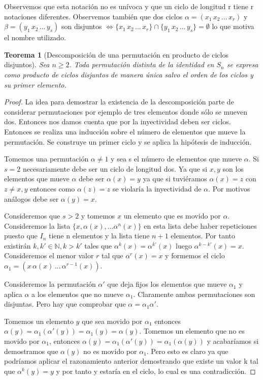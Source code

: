 \documentclass{article}
\theoremstyle{theorem-style}  %
\newtheorem{theorem}{Teorema}[section]  %
\theoremstyle{definition-style}
\theoremstyle{example-style}
\begin{document}
Observemos que esta notación no es unívoca y que un ciclo de longitud r tiene r notaciones diferentes. Observemos también que dos ciclos $\alpha = (x_1 \, x_2 \, ... \, x_r)$ y $\beta = (y_1 \, x_2 \, ... \, y_s)$ son disjuntos $\iff \{x_1 \, x_2 \, ... \, x_r \} \cap \{y_1 \, x_2 \, ... \, y_s \} = \emptyset$ lo que motiva el nombre utilizado.

\begin{theorem}[Descomposición de una permutación en producto de ciclos disjuntos]
Sea $n \ge 2$. Toda permutación distinta de la identidad en $S_n$ se expresa como producto de ciclos disjuntos de manera única salvo el orden de los ciclos y su primer elemento.
\end{theorem}

\begin{proof}
La idea para demostrar la existencia de la descomposición parte de considerar permutaciones por ejemplo de tres elementos donde sólo se mueven dos. Entonces nos damos cuenta que por la inyectividad deben ser ciclos. Entonces se realiza una inducción sobre el número de elementos que mueve la permutación. Se construye un primer ciclo y se aplica la hipótesis de inducción.

Tomemos una permutación $\alpha \neq 1$ y sea s el número de elementos que mueve $\alpha$. Si $s = 2$ necesariamente debe ser un ciclo de longitud dos. Ya que si $x,y$ son los elementos que mueve $\alpha$ debe ser $\alpha(x) = y$ ya que si tuviéramos $\alpha(x) = z$ con $z \neq x,y$ entonces como $\alpha(z) = z$ se violaría la inyectividad de $\alpha$. Por motivos análogos debe ser $\alpha(y) = x$.

Consideremos que $s > 2$ y tomemos $x$ un elemento que es movido por $\alpha$. Consideremos la lista $\{x,\alpha(x),...\alpha^n(x)\}$ en esta lista debe haber repeticiones puesto que $I_n$ tiene n elementos y la lista tiene $n+1$ elementos. Por tanto existirán $k,k' \in \mathbb{N}, k > k'$ tales que $\alpha^{k}(x) = \alpha^{k'}(x)$ luego $\alpha^{k-k'}(x) = x$. Consideremos el menor valor $r$ tal que $\alpha^r(x) = x$ y formemos el ciclo $\alpha_1 = (x \, \alpha(x) \, ...  \, \alpha^{r-1}(x))$.

Consideremos la permutación $\alpha'$ que deja fijos los elementos que mueve $\alpha_1$ y aplica $\alpha$ a los elementos que no mueve $\alpha_1$. Claramente  ambas permutaciones son disjuntas. Pero hay que comprobar que $\alpha = \alpha_1 \alpha'$.

Tomemos un elemento $y$ que sea movido por $\alpha_1$ entonces $\alpha(y) = \alpha_1(\alpha'(y)) = \alpha_1(y) = \alpha(y)$. Tomemos un elemento que no es movido por $\alpha_1$, entonces $\alpha(y) = \alpha_1(\alpha'(y)) = \alpha_1(\alpha(y))$ y acabaríamos si demostramos que $\alpha(y)$ no es movido por $\alpha_1$. Pero esto es claro ya que podríamos aplicar el razonamiento anterior demostrando que existe un valor k tal que $\alpha^k(y) = y$ y por tanto y estaría en el ciclo, lo cual es una contradicción.


\end{proof}
\end{document}
